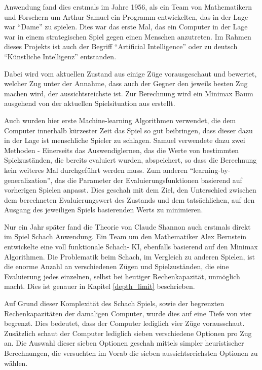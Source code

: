
Anwendung fand dies erstmals im Jahre 1956, als ein Team von Mathematikern und Forschern um Arthur Samuel ein Programm entwickelten, das in der Lage war ``Dame'' zu spielen. Dies war das erste Mal, das ein Computer in der Lage war in einem strategischen Spiel gegen einen Menschen anzutreten. Im Rahmen dieses Projekts ist auch der Begriff ``Artificial Intelligence'' oder zu deutsch ``Künstliche Intelligenz'' entstanden. \cite{Kurenkov2019}

Dabei wird vom aktuellen Zustand aus einige Züge vorausgeschaut und bewertet, welcher Zug unter der Annahme, dass auch der Gegner den jeweils besten Zug machen wird, der aussichtsreichste ist. Zur Berechnung wird ein Minimax Baum ausgehend von der aktuellen Spielsituation aus erstellt.


Auch wurden hier erste Machine-learning Algorithmen verwendet, die dem Computer innerhalb kürzester Zeit das Spiel so gut beibringen, dass dieser dazu in der Lage ist menschliche Spieler zu schlagen. Samuel verwendete dazu zwei Methoden - Einerseits  das Auswendiglernen, das die Werte von bestimmten Spielzuständen, die bereits evaluiert wurden, abspeichert, so dass die Berechnung kein weiteres Mal durchgeführt werden muss. Zum anderen ``learning-by-generalization'', das die Parameter der Evaluierungsfunktionen basierend auf vorherigen Spielen anpasst. Dies geschah mit dem Ziel, den Unterschied zwischen dem berechneten Evaluierungswert des Zustands und dem tatsächlichen, auf den Ausgang des jeweiligen Spiels basierenden Werts zu minimieren. \cite{Samuel1959}


Nur ein Jahr später fand die Theorie von Claude Shannon auch erstmals direkt im Spiel Schach Anwendung. Ein Team um den Mathematiker Alex Bernstein entwickelte eine voll funktionale Schach- KI, ebenfalls basierend auf den Minimax Algorithmen. \cite{Kurenkov2019} Die Problematik beim Schach, im Vergleich zu anderen Spielen, ist die enorme Anzahl an verschiedenen Zügen und Spielzuständen, die eine Evaluierung jedes einzelnen, selbst bei heutiger Rechenkapazität, unmöglich macht. Dies ist genauer in Kapitel \ref{depth_limit} beschrieben. 

Auf Grund dieser Komplexität des Schach Spiels, sowie der begrenzten Rechenkapazitäten der damaligen Computer, wurde dies auf eine Tiefe von vier begrenzt. Dies bedeutet, dass der Computer lediglich vier Züge vorausschaut. Zusätzlich schaut der Computer lediglich sieben verschiedene Optionen pro Zug an. Die Auswahl dieser sieben Optionen geschah mittels simpler heuristischer Berechnungen, die versuchten im Vorab die sieben aussichtsreichsten Optionen zu wählen. \cite{Bernstein1958}

